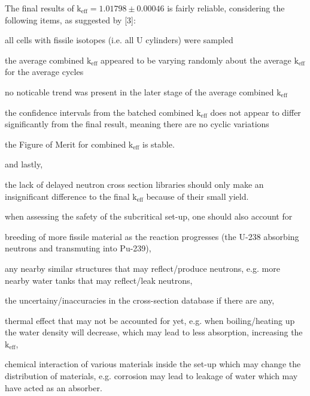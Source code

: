 \documentclass[a4paper, 11pt]{article}
\begin{document}
\begin{compactenum}
	\item The final results of $\text{k}_{\text{eff}} = 1.01798 \pm 0.00046$ is fairly reliable, considering the following items, as suggested by [3]:
	\begin{compactitem}
		\item all cells with fissile isotopes (i.e. all U cylinders) were sampled
		\item the average combined $\text{k}_{\text{eff}}$ appeared to be varying randomly about the average $\text{k}_{\text{eff}}$ for the average cycles
		\item no noticable trend was present in the later stage of the average combined $\text{k}_{\text{eff}}$
		\item the confidence intervals from the batched combined $\text{k}_{\text{eff}}$ does not appear to differ significantly from the final result, meaning there are no cyclic variations
		\item the Figure of Merit for combined $\text{k}_{\text{eff}}$ is stable.
	\end{compactitem}
	and lastly,
	\begin{compactitem}
		\item the lack of delayed neutron cross section libraries should only make an insignificant difference to the final $\text{k}_{\text{eff}}$ because of their small yield.
	\end{compactitem}
	\item when assessing the safety of the subcritical set-up, one should also account for
	\begin{compactitem}
		\item breeding of more fissile material as the reaction progresses (the U-238 absorbing neutrons and transmuting into Pu-239),
		\item any nearby similar structures that may reflect/produce neutrons, e.g. more nearby water tanks that may reflect/leak neutrons,
		\item the uncertainy/inaccuracies in the cross-section database if there are any,
		\item thermal effect that may not be accounted for yet, e.g. when boiling/heating up the water density will decrease, which may lead to less absorption, increasing the $\text{k}_{\text{eff}}$,
		\item chemical interaction of various materials inside the set-up which may change the distribution of materials, e.g. corrosion may lead to leakage of water which may have acted as an absorber.
	\end{compactitem}
\end{compactenum}
\end{document}
